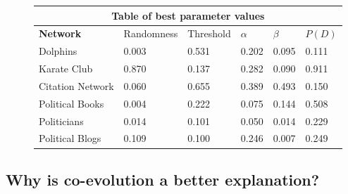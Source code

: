 \documentclass{article}
\begin{document}
\begin{figure}[H]
\begin{center}
    
\begin{tabular}{ |p{3cm}||p{2cm}|p{2cm}|p{2cm}|p{2cm}|p{2cm}|}
    \hline
    \multicolumn{6}{|c|}{Table of best parameter values} \\
    \hline
    \bf{Network} & Randomness & Threshold & $\alpha$ & $\beta$ & $P(D)$\\
    \hline
    Dolphins   & 0.003    &0.531&   0.202&   0.095&   0.111\\
    Karate Club&   0.870  & 0.137   &0.282&   0.090&   0.911\\
    Citation Network   &0.060 & 0.655&  0.389&   0.493&   0.150\\
    Political Books &0.004 & 0.222&  0.075&   0.144&   0.508\\
    Politicians&   0.014  & 0.101 &0.050&   0.014&   0.229\\
    Political Blogs & 0.109  & 0.100   &0.246&   0.007&   0.249\\
    \hline
\end{tabular}
\end{center}
\end{figure}

\subsection{Why is co-evolution a better explanation?}
\end{document}
